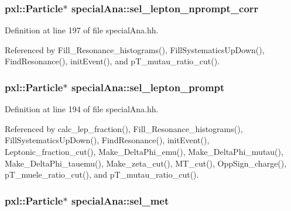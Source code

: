 \subsubsection[{sel\-\_\-lepton\-\_\-nprompt\-\_\-corr}]{\setlength{\rightskip}{0pt plus 5cm}pxl\-::\-Particle$\ast$ special\-Ana\-::sel\-\_\-lepton\-\_\-nprompt\-\_\-corr}\label{classspecialAna_aa92d86a2b74ba4f7157522752e638a22}


Definition at line 197 of file special\-Ana.\-hh.



Referenced by Fill\-\_\-\-Resonance\-\_\-histograms(), Fill\-Systematics\-Up\-Down(), Find\-Resonance(), init\-Event(), and p\-T\-\_\-mutau\-\_\-ratio\-\_\-cut().

\subsubsection[{sel\-\_\-lepton\-\_\-prompt}]{\setlength{\rightskip}{0pt plus 5cm}pxl\-::\-Particle$\ast$ special\-Ana\-::sel\-\_\-lepton\-\_\-prompt}\label{classspecialAna_aee9025a3b86abbffe066e42aa521d801}


Definition at line 194 of file special\-Ana.\-hh.



Referenced by calc\-\_\-lep\-\_\-fraction(), Fill\-\_\-\-Resonance\-\_\-histograms(), Fill\-Systematics\-Up\-Down(), Find\-Resonance(), init\-Event(), Leptonic\-\_\-fraction\-\_\-cut(), Make\-\_\-\-Delta\-Phi\-\_\-emu(), Make\-\_\-\-Delta\-Phi\-\_\-mutau(), Make\-\_\-\-Delta\-Phi\-\_\-tauemu(), Make\-\_\-zeta\-\_\-cut(), M\-T\-\_\-cut(), Opp\-Sign\-\_\-charge(), p\-T\-\_\-muele\-\_\-ratio\-\_\-cut(), and p\-T\-\_\-mutau\-\_\-ratio\-\_\-cut().

\subsubsection[{sel\-\_\-met}]{\setlength{\rightskip}{0pt plus 5cm}pxl\-::\-Particle$\ast$ special\-Ana\-::sel\-\_\-met}\label{classspecialAna_adf5da0cbdfda1f8b7e2504cdd3506ba0}



